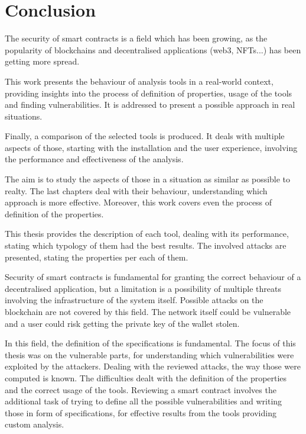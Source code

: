 
\chapter{Conclusion}
\label{ch:Conclusion}
The security of smart contracts is a field which has been growing, 
as the popularity of blockchains and decentralised applications (web3, NFTs...) has been getting more spread.

This work presents the behaviour of analysis tools in a real-world context, 
providing insights into the process of definition of properties, usage of the tools and finding vulnerabilities.
It is addressed to present a possible approach in real situations.

Finally, a comparison of the selected tools is produced.
It deals with multiple aspects of those, starting with the installation and the user experience, involving the performance and effectiveness of the analysis.

The aim is to study the aspects of those in a situation as 
similar as possible to realty. 
The last chapters deal with their behaviour, understanding which approach is more effective. 
Moreover, this work covers even the process of definition of the properties.

This thesis provides the description of each tool, dealing with its performance, stating which typology of them had the best results. 
The involved attacks are presented, stating the properties per each of them. 

Security of smart contracts is fundamental for granting the correct behaviour of a decentralised application, but a limitation is a possibility 
of multiple threats involving the infrastructure of the system itself.
Possible attacks on the blockchain are not covered by this field. 
The network itself could be vulnerable and a user could risk getting the private key of the wallet stolen. 

In this field, the definition of the specifications is fundamental.
The focus of this thesis was on the vulnerable parts, for understanding which vulnerabilities were exploited by the attackers.
Dealing with the reviewed attacks, the way those were computed is known. 
The difficulties dealt with the definition of the properties and the correct usage of the tools. 
Reviewing a smart contract involves the additional task of trying to define all the possible vulnerabilities and writing those in form of specifications, 
for effective results from the tools providing custom analysis.

